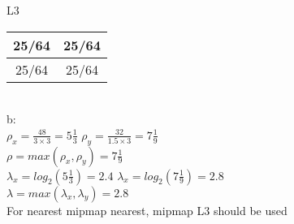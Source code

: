 \documentclass[12pt]{article}\usepackage{amsmath}
\begin{document}
L3
\begin{tabular}{|c|c|}
\hline
25/64 & 25/64\\
\hline
25/64 & 25/64\\
\hline
\end{tabular}
\\
b:\\
$\rho_x = \frac{48}{3\times3} = 5\frac{1}{3}$
\hspace{10pt}
$\rho_y = \frac{32}{1.5\times 3} = 7\frac{1}{9}$\\
$\rho = max(\rho_x, \rho_y) = 7\frac{1}{9}$\\
$\lambda_x = log_2 (5\frac{1}{3}) = 2.4$
\hspace{10pt}
$\lambda_x = log_2 (7\frac{1}{9}) = 2.8$\\
$\lambda = max(\lambda_x, \lambda_y) = 2.8$\\
For nearest mipmap nearest, mipmap L3 should be used
\end{document}
